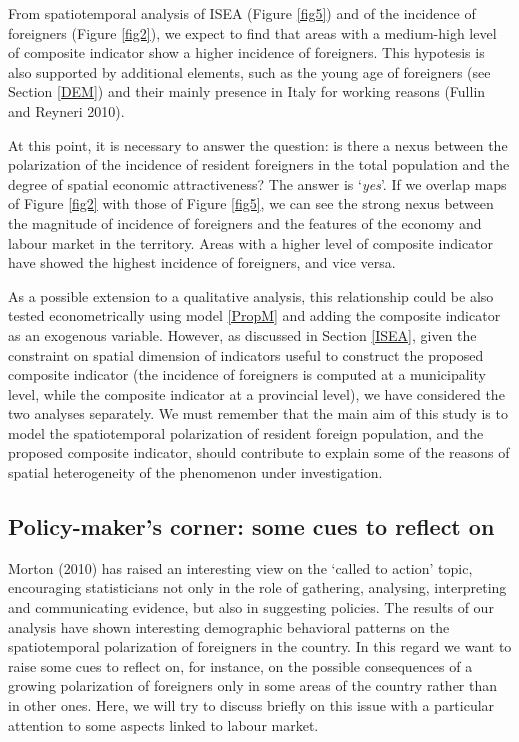 \documentclass[10pt]{article}
\theoremstyle{definition}
\theoremstyle{plain}
\begin{document}
From spatiotemporal analysis of ISEA (Figure \ref{fig5}) and of the incidence of foreigners (Figure \ref{fig2}), we expect to find that areas with a medium-high level of composite indicator show a higher incidence of foreigners. This hypotesis is also supported by additional elements, such as the young age of foreigners (see Section \ref{DEM}) and their mainly presence in Italy for working reasons (Fullin and Reyneri 2010). 

At this point, it is necessary to answer the question: is there a nexus between the polarization of the incidence of resident foreigners in the total population and the degree of spatial economic attractiveness? The answer is `\textsl{yes}'. If we overlap maps of Figure \ref{fig2} with those of Figure \ref{fig5}, we can see the strong nexus between the magnitude of incidence of foreigners and the features of the economy and labour market in the territory. Areas with a higher level of composite indicator have showed the highest incidence of foreigners, and vice versa.

As a possible extension to a qualitative analysis, this relationship could be also tested econometrically using model \ref{PropM} and adding the composite indicator as an exogenous variable. However, as discussed in Section \ref{ISEA}, given the constraint on spatial dimension of indicators useful to construct the proposed composite indicator (the incidence of foreigners is computed at a municipality level, while the composite indicator at a provincial level), we have considered the two analyses separately. We must remember that the main aim of this study is to model the spatiotemporal polarization of resident foreign population, and the proposed composite indicator, should contribute to explain some of the reasons of spatial heterogeneity of the phenomenon under investigation.



\subsection{Policy-maker's corner: some cues to reflect on  \label{PM}}

Morton (2010) has raised an interesting view on the `called to action' topic, encouraging statisticians not only in the role of gathering, analysing, interpreting and communicating evidence, but also in suggesting policies. The results of our analysis have shown interesting demographic behavioral patterns on the spatiotemporal polarization of foreigners in the country. In this regard we want to raise some cues to reflect on, for instance, on the possible consequences of a growing polarization of foreigners only in some areas of the country rather than in other ones. Here, we will try to discuss briefly on this issue with a particular attention to some aspects linked to labour market.
\end{document}
